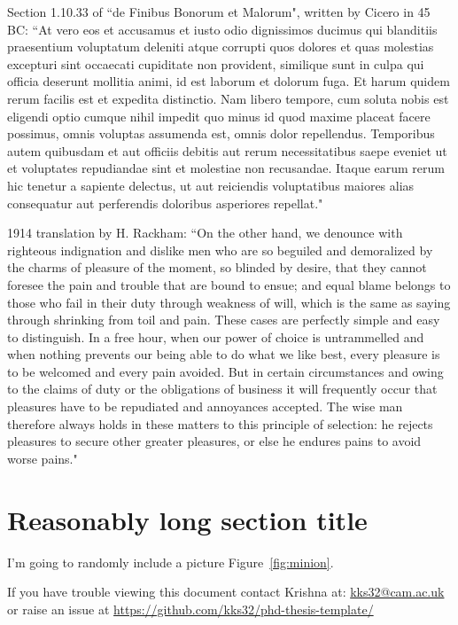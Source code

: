 Section 1.10.33 of ``de Finibus Bonorum et Malorum", written by Cicero in 45 BC: ``At vero eos et accusamus et iusto odio dignissimos ducimus qui blanditiis praesentium voluptatum deleniti atque corrupti quos dolores et quas molestias excepturi sint occaecati cupiditate non provident, similique sunt in culpa qui officia deserunt mollitia animi, id est laborum et dolorum fuga. Et harum quidem rerum facilis est et expedita distinctio. Nam libero tempore, cum soluta nobis est eligendi optio cumque nihil impedit quo minus id quod maxime placeat facere possimus, omnis voluptas assumenda est, omnis dolor repellendus. Temporibus autem quibusdam et aut officiis debitis aut rerum necessitatibus saepe eveniet ut et voluptates repudiandae sint et molestiae non recusandae. Itaque earum rerum hic tenetur a sapiente delectus, ut aut reiciendis voluptatibus maiores alias consequatur aut perferendis doloribus asperiores repellat."

1914 translation by H. Rackham: ``On the other hand, we denounce with righteous indignation and dislike men who are so beguiled and demoralized by the charms of pleasure of the moment, so blinded by desire, that they cannot foresee the pain and trouble that are bound to ensue; and equal blame belongs to those who fail in their duty through weakness of will, which is the same as saying through shrinking from toil and pain. These cases are perfectly simple and easy to distinguish. In a free hour, when our power of choice is untrammelled and when nothing prevents our being able to do what we like best, every pleasure is to be welcomed and every pain avoided. But in certain circumstances and owing to the claims of duty or the obligations of business it will frequently occur that pleasures have to be repudiated and annoyances accepted. The wise man therefore always holds in these matters to this principle of selection: he rejects pleasures to secure other greater pleasures, or else he endures pains to avoid worse pains."

\section[Short title]{Reasonably long section title}

I'm going to randomly include a picture Figure~\ref{fig:minion}.


If you have trouble viewing this document contact Krishna at: \href{mailto:kks32@cam.ac.uk}{kks32@cam.ac.uk} or raise an issue at \url{https://github.com/kks32/phd-thesis-template/}


